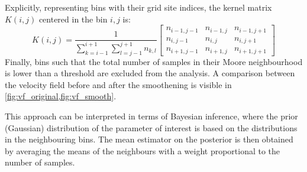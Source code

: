 Explicitly, representing bins with their grid site indices, the kernel matrix $K(i, j)$ centered in the bin $i, j$ is:
\begin{equation}
 K(i, j) = \frac{1}{\displaystyle \sum_{k = i-1}^{i+1}\sum_{l = j-1}^{j+1} n_{k,l}}
 \begin{bmatrix}
  n_{i-1,j-1} & n_{i-1, j} & n_{i-1, j+1} \\
  n_{i,j-1}   & n_{i, j}   & n_{i, j+1}   \\
  n_{i+1,j-1} & n_{i+1, j} & n_{i+1, j+1}
 \end{bmatrix}
\end{equation}
Finally, bins such that the total number of samples in their Moore neighbourhood is lower than a threshold are excluded from the analysis. A comparison between the velocity field before and after the smoothening is visible in \cref{fig:vf_original,fig:vf_smooth}.

This approach can be interpreted in terms of Bayesian inference, where the prior (Gaussian) distribution of the parameter of interest is based on the distributions in the neighbouring bins. The mean estimator on the posterior is then obtained by averaging the means of the neighbours with a weight proportional to the number of samples.


